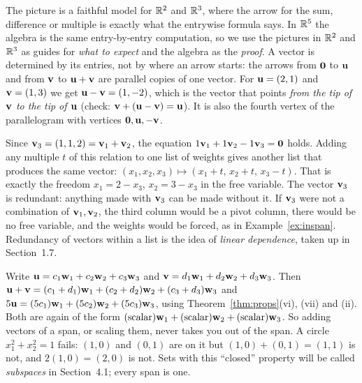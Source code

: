 \documentclass[11pt]{article}
\begin{document}
\begin{description}[leftmargin=0pt,itemsep=5pt]
  \item[Pause and think \ref{think:arrow}.] The picture is a faithful model for $\mathbb{R}^2$ and $\mathbb{R}^3$, where the arrow for the sum, difference or
        multiple is exactly what the entrywise formula says. In $\mathbb{R}^5$ the algebra is the same entry-by-entry computation,
        so we use the pictures in $\mathbb{R}^2$ and $\mathbb{R}^3$ as guides for \emph{what to expect} and the algebra as the \emph{proof}. A vector is
        determined by its entries, not by where an arrow starts: the arrows from $\mathbf{0}$ to $\mathbf{u}$ and from $\mathbf{v}$ to $\mathbf{u}+\mathbf{v}$ are
        parallel copies of one vector. For $\mathbf{u}=(2,1)$ and $\mathbf{v}=(1,3)$ we get $\mathbf{u}-\mathbf{v}=(1,-2)$, which is the vector that points \emph{from the
        tip of $\mathbf{v}$ to the tip of $\mathbf{u}$} (check: $\mathbf{v}+(\mathbf{u}-\mathbf{v})=\mathbf{u}$). It is also the fourth vertex of the parallelogram with vertices
        $\mathbf{0},\mathbf{u},-\mathbf{v}$.
  \item[Pause and think \ref{think:recipes}.] Since $\mathbf{v}_3=(1,1,2)=\mathbf{v}_1+\mathbf{v}_2$, the equation
        $1\mathbf{v}_1+1\mathbf{v}_2-1\mathbf{v}_3=\mathbf{0}$ holds. Adding any multiple $t$ of this relation to one list of weights gives another list that produces the same vector:
        $(x_1,x_2,x_3)\mapsto(x_1+t,\,x_2+t,\,x_3-t)$. That is exactly the freedom $x_1=2-x_3$, $x_2=3-x_3$ in the
        free variable. The vector $\mathbf{v}_3$ is redundant: anything made with $\mathbf{v}_3$ can be made without it. If $\mathbf{v}_3$ were not a combination of
        $\mathbf{v}_1,\mathbf{v}_2$, the third column would be a pivot column, there would be no free variable, and the weights would be forced, as in
        Example~\ref{ex:inspan}. Redundancy of vectors within a list is the idea of \emph{linear dependence}, taken up in Section~1.7.
  \item[Pause and think \ref{think:closure}.] Write $\mathbf{u}=c_1\mathbf{w}_1+c_2\mathbf{w}_2+c_3\mathbf{w}_3$ and $\mathbf{v}=d_1\mathbf{w}_1+d_2\mathbf{w}_2+d_3\mathbf{w}_3$. Then
        $\mathbf{u}+\mathbf{v}=(c_1+d_1)\mathbf{w}_1+(c_2+d_2)\mathbf{w}_2+(c_3+d_3)\mathbf{w}_3$ and
        $5\mathbf{u}=(5c_1)\mathbf{w}_1+(5c_2)\mathbf{w}_2+(5c_3)\mathbf{w}_3$, using Theorem~\ref{thm:props}(vi), (vii) and (ii). Both are again of the form
        $(\text{scalar})\mathbf{w}_1+(\text{scalar})\mathbf{w}_2+(\text{scalar})\mathbf{w}_3$. So adding vectors of a span, or scaling them, never takes you out of the span.
        A circle $x_1^2+x_2^2=1$ fails: $(1,0)$ and $(0,1)$ are on it but $(1,0)+(0,1)=(1,1)$ is not, and $2(1,0)=(2,0)$ is not.
        Sets with this ``closed'' property will be called \emph{subspaces} in Section~4.1; every span is one.

\end{description}
\end{document}
